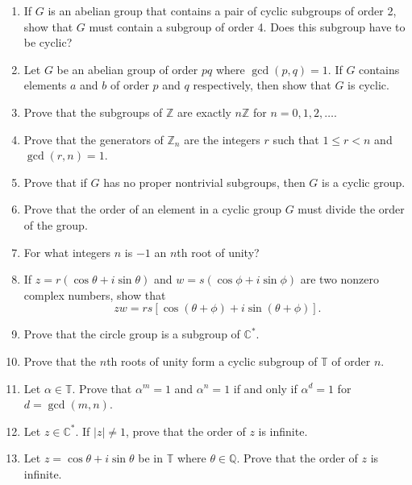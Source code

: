 \documentclass[12pt,reqno]{amsart}
\begin{document}
\begin{enumerate}[{\bf 1.}]
 
\item
If $G$ is an abelian group that contains a pair of cyclic subgroups of
order 2, show that $G$ must contain a subgroup of order 4. Does this
subgroup have to be cyclic?
 
 
\item
Let $G$ be an abelian group of order $pq$ where $\gcd(p,q) = 1$.  If
$G$ contains elements $a$ and $b$ of order $p$ and $q$ respectively,
then show that $G$ is cyclic. 
 
 
\item
Prove that the subgroups of ${\mathbb Z}$ are exactly $n{\mathbb Z}$ for $n
= 0, 1, 2, \ldots$. 
 
 
\item
Prove that the generators of ${\mathbb Z}_n$ are the integers $r$ such
that $1 \leq r < n$ and $\gcd(r,n) =  1$. 
 
 
\item
Prove that if $G$ has no proper nontrivial subgroups, then $G$ is a 
cyclic group.
 
 
 
\item
Prove that the order of an element in a cyclic group $G$ must divide
the order of the  group. 
 
 
\item
For what integers $n$ is $-1$ an $n$th root of unity?
 
 
\item
If $z = r( \cos \theta + i \sin \theta)$ and $w = s(\cos \phi + i \sin
\phi)$ are two nonzero complex numbers, show that
\[
zw = rs[ \cos( \theta + \phi)  + i \sin( \theta + \phi)].
\]
 
 
\item
Prove that the circle group is a subgroup of  ${\mathbb C}^*$.
 
 
\item
Prove that the $n$th roots of unity form a cyclic subgroup of ${\mathbb
T}$  of order $n$. 
 
 
\item
Let $\alpha \in \mathbb T$. Prove that $\alpha^m =1$ and $\alpha^n = 1$ if and only if $\alpha^d = 1$
for $d = \gcd(m,n)$.

 
 
\item
Let $z \in {\mathbb C}^\ast$. If $|z| \neq 1$, prove that the order of
$z$ is infinite. 
 
 
\item
Let $z =\cos \theta + i \sin \theta$ be in ${\mathbb T}$ where $\theta
\in {\mathbb Q}$.  Prove that the order of $z$ is infinite.
 
\end{enumerate}
 
\end{document}
